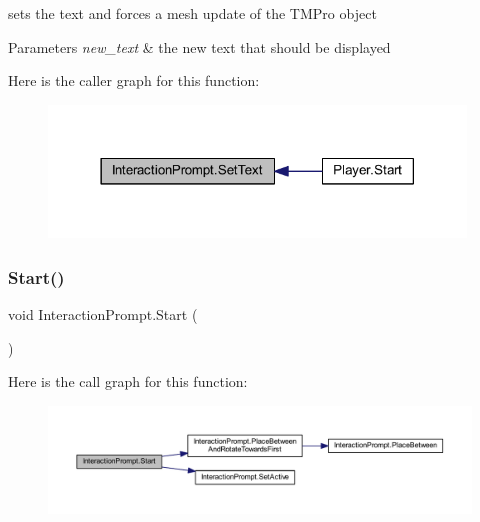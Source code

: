 sets the text and forces a mesh update of the T\+M\+Pro object 


\begin{DoxyParams}{Parameters}
{\em new\+\_\+text} & the new text that should be displayed\\
\hline
\end{DoxyParams}
Here is the caller graph for this function\+:
\nopagebreak
\begin{figure}[H]
\begin{center}
\leavevmode
\includegraphics[width=314pt]{class_interaction_prompt_ac68329e8bcb18bc4556695f506d5b410_icgraph}
\end{center}
\end{figure}
\mbox{\label{class_interaction_prompt_ada65c2aa759ea18aa2ccf6ba8cd3843b}} 
\subsubsection{\texorpdfstring{Start()}{Start()}}
{\footnotesize\ttfamily void Interaction\+Prompt.\+Start (\begin{DoxyParamCaption}{ }\end{DoxyParamCaption})\hspace{0.3cm}{\ttfamily [private]}}

Here is the call graph for this function\+:
\nopagebreak
\begin{figure}[H]
\begin{center}
\leavevmode
\includegraphics[width=350pt]{class_interaction_prompt_ada65c2aa759ea18aa2ccf6ba8cd3843b_cgraph}
\end{center}
\end{figure}


